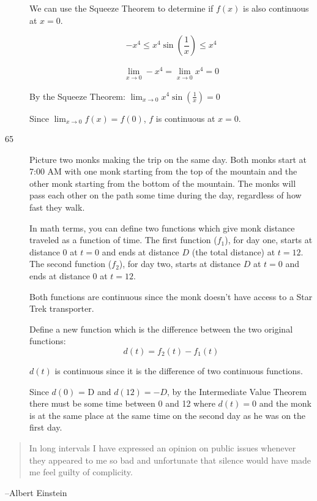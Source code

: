 \documentclass[letterpaper, landscape]{exam}
\begin{document}
\begin{description}
        We can use the Squeeze Theorem to determine if $f(x)$ is also continuous at
        $x = 0$.

        \[
          -x^4 \leq x^4 \sin \left( \frac{1}{x} \right) \leq x^4
        \]

        \begin{align*}
          \lim_{x \to 0} -x^4 = \lim_{x \to 0} x^4 = 0
        \end{align*}

        By the Squeeze Theorem: $\lim_{x \to 0} x^4 \sin \left( \frac{1}{x} \right) = 0$

        Since $\lim_{x \to 0} f(x) = f(0)$, $f$ is continuous at $x = 0$.

      \newpage

      \item[65]
        Picture two monks making the trip on the same day. Both monks start at 7:00 AM
        with one monk starting from the top of the mountain and the other monk starting
        from the bottom of the mountain. The monks will pass each other on the path some
        time during the day, regardless of how fast they walk.

        In math terms, you can define two functions which give monk distance traveled as a
        function of time. The first function ($f_1$), for day one, starts at distance 0 at
        $t = 0$ and ends at distance $D$ (the total distance) at $t = 12$. The second
        function ($f_2$), for day two, starts at distance $D$ at $t = 0$ and ends at
        distance 0 at $t = 12$.

        Both functions are continuous since the monk doesn't have access to a Star Trek
        transporter.

        Define a new function which is the difference between the two original functions:
        \[
          d(t) = f_2(t) - f_1(t)
        \]

        $d(t)$ is continuous since it is the difference of two continuous functions.
        
        Since $d(0)$ = D and $d(12) = -D$, by the Intermediate Value Theorem there must
        be some time between 0 and 12 where $d(t) = 0$ and the monk is at the same place
        at the same time on the second day as he was on the first day.

    \end{description}

  \else
    \vspace{10 cm}
    \begin{quote}
      \begin{em}
        In long intervals I have expressed an opinion on public issues whenever they
        appeared to me so bad and unfortunate that silence would have made me feel guilty
        of complicity. 
      \end{em}
    \end{quote}
    \hspace{1 cm} --Albert Einstein
  \fi
\end{document}
